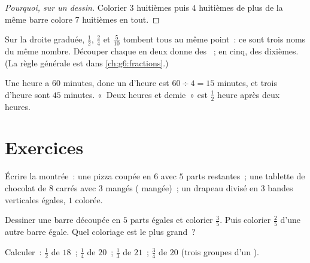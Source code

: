 \begin{proof}[Pourquoi, sur un dessin]
Colorier $3$ huitièmes puis $4$ huitièmes de plus de la même barre
colore $7$ huitièmes en tout.
\end{proof}

\begin{example}\label{ex:g4:fractions:equal}
Sur la droite graduée, $\frac12$, $\frac24$ et $\frac{5}{10}$
tombent tous au même point~: ce sont trois noms du même nombre.
Découper chaque  en deux donne des ~; en cinq, des
dixièmes. (La règle générale est dans \cref{ch:g6:fractions}.)
\end{example}

\begin{example}\label{ex:g4:fractions:hour}
Une heure a $60$ minutes, donc un  d'heure est
$60 \div 4 = 15$ minutes, et trois  d'heure sont $45$
minutes. «~Deux heures et demie~» est $\frac12$ heure après deux
heures.
\end{example}

\section{Exercices}

\begin{exercise}[$\star$]\label{exo:g4:fractions:1}
Écrire la  montrée~: une pizza coupée en $6$ avec $5$ parts
restantes~; une tablette de chocolat de $8$ carrés avec $3$ mangés
( mangée)~; un drapeau divisé en $3$ bandes verticales
égales, $1$ colorée.
\end{exercise}

\begin{exercise}[$\star$]\label{exo:g4:fractions:2}
Dessiner une barre découpée en $5$ parts égales et colorier
$\frac35$. Puis colorier $\frac{2}{5}$ d'une autre barre égale.
Quel coloriage est le plus grand~?
\end{exercise}

\begin{exercise}[$\star$]\label{exo:g4:fractions:3}
Calculer~: $\frac12$ de $18$~; \quad $\frac14$ de $20$~; \quad
$\frac13$ de $21$~; \quad $\frac34$ de $20$ (trois groupes d'un
).
\end{exercise}

